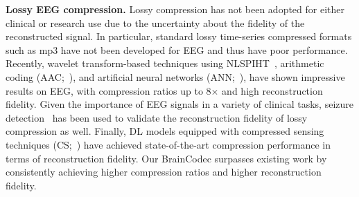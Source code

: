 \textbf{Lossy EEG compression.} Lossy compression has not been adopted for either clinical or research use due to the uncertainty about the fidelity of the reconstructed signal. In particular, standard lossy time-series compressed formats such as mp3 have not been developed for EEG and thus have poor performance. Recently, wavelet transform-based techniques using NLSPIHT~\citep{Xu2015}, arithmetic coding (AAC;~\cite{Nguyen2017}), and artificial neural networks (ANN;~\cite{Hejrati2017}), have shown impressive results on EEG, with compression ratios up to 8$\times$ and high reconstruction fidelity. Given the importance of EEG signals in a variety of clinical tasks, seizure detection~\citep{Nguyen2018} has been used to validate the reconstruction fidelity of lossy compression as well. Finally, DL models equipped with compressed sensing techniques (CS;~\cite{Du2024}) have achieved state-of-the-art compression performance in terms of reconstruction fidelity. Our BrainCodec surpasses existing work by consistently achieving higher compression ratios and higher reconstruction fidelity.